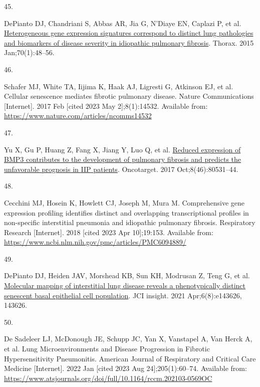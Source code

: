 \documentclass[
]{article}
\newlength{\cslhangindent}
\newlength{\csllabelwidth}
\newlength{\cslentryspacingunit} %
\newenvironment{CSLReferences}[2] %
 {%
  \setlength{\parindent}{0pt}
  \ifodd #1
  \let\oldpar\par
  \def\par{\hangindent=\cslhangindent\oldpar}
  \fi
  \setlength{\parskip}{#2\cslentryspacingunit}
 }%
 {}
\newcommand{\CSLLeftMargin}[1]{\parbox[t]{\csllabelwidth}{#1}}
\newcommand{\CSLRightInline}[1]{\parbox[t]{\linewidth - \csllabelwidth}{#1}\break}
\begin{document}
\begin{CSLReferences}{0}{0}
\leavevmode{}%
\CSLLeftMargin{45. }%
\CSLRightInline{DePianto DJ, Chandriani S, Abbas AR, Jia G, N'Diaye EN, Caplazi P, et al. \href{https://doi.org/10.1136/thoraxjnl-2013-204596}{Heterogeneous gene expression signatures correspond to distinct lung pathologies and biomarkers of disease severity in idiopathic pulmonary fibrosis}. Thorax. 2015 Jan;70(1):48--56. }

\leavevmode{}%
\CSLLeftMargin{46. }%
\CSLRightInline{Schafer MJ, White TA, Iijima K, Haak AJ, Ligresti G, Atkinson EJ, et al. Cellular senescence mediates fibrotic pulmonary disease. Nature Communications {[}Internet{]}. 2017 Feb {[}cited 2023 May 2{]};8(1):14532. Available from: \url{https://www.nature.com/articles/ncomms14532}}

\leavevmode{}%
\CSLLeftMargin{47. }%
\CSLRightInline{Yu X, Gu P, Huang Z, Fang X, Jiang Y, Luo Q, et al. \href{https://doi.org/10.18632/oncotarget.20083}{Reduced expression of {BMP3} contributes to the development of pulmonary fibrosis and predicts the unfavorable prognosis in {IIP} patients}. Oncotarget. 2017 Oct;8(46):80531--44. }

\leavevmode{}%
\CSLLeftMargin{48. }%
\CSLRightInline{Cecchini MJ, Hosein K, Howlett CJ, Joseph M, Mura M. Comprehensive gene expression profiling identifies distinct and overlapping transcriptional profiles in non-specific interstitial pneumonia and idiopathic pulmonary fibrosis. Respiratory Research {[}Internet{]}. 2018 {[}cited 2023 Apr 10{]};19:153. Available from: \url{https://www.ncbi.nlm.nih.gov/pmc/articles/PMC6094889/}}

\leavevmode{}%
\CSLLeftMargin{49. }%
\CSLRightInline{DePianto DJ, Heiden JAV, Morshead KB, Sun KH, Modrusan Z, Teng G, et al. \href{https://doi.org/10.1172/jci.insight.143626}{Molecular mapping of interstitial lung disease reveals a phenotypically distinct senescent basal epithelial cell population}. JCI insight. 2021 Apr;6(8):e143626, 143626. }

\leavevmode{}%
\CSLLeftMargin{50. }%
\CSLRightInline{De Sadeleer LJ, McDonough JE, Schupp JC, Yan X, Vanstapel A, Van Herck A, et al. Lung {Microenvironments} and {Disease} {Progression} in {Fibrotic} {Hypersensitivity} {Pneumonitis}. American Journal of Respiratory and Critical Care Medicine {[}Internet{]}. 2022 Jan {[}cited 2023 Aug 24{]};205(1):60--74. Available from: \url{https://www.atsjournals.org/doi/full/10.1164/rccm.202103-0569OC}}


\end{CSLReferences}
\end{document}
